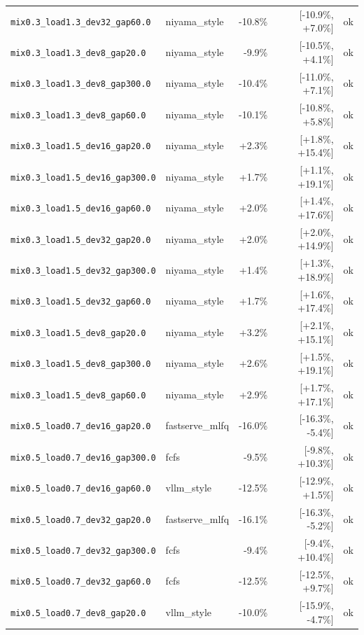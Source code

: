\begin{longtable}{llrrl}
\texttt{mix0.3\_load1.3\_dev32\_gap60.0} & niyama\_style & -10.8\% & [-10.9\%, +7.0\%] & ok \\
\texttt{mix0.3\_load1.3\_dev8\_gap20.0} & niyama\_style & -9.9\% & [-10.5\%, +4.1\%] & ok \\
\texttt{mix0.3\_load1.3\_dev8\_gap300.0} & niyama\_style & -10.4\% & [-11.0\%, +7.1\%] & ok \\
\texttt{mix0.3\_load1.3\_dev8\_gap60.0} & niyama\_style & -10.1\% & [-10.8\%, +5.8\%] & ok \\
\texttt{mix0.3\_load1.5\_dev16\_gap20.0} & niyama\_style & +2.3\% & [+1.8\%, +15.4\%] & ok \\
\texttt{mix0.3\_load1.5\_dev16\_gap300.0} & niyama\_style & +1.7\% & [+1.1\%, +19.1\%] & ok \\
\texttt{mix0.3\_load1.5\_dev16\_gap60.0} & niyama\_style & +2.0\% & [+1.4\%, +17.6\%] & ok \\
\texttt{mix0.3\_load1.5\_dev32\_gap20.0} & niyama\_style & +2.0\% & [+2.0\%, +14.9\%] & ok \\
\texttt{mix0.3\_load1.5\_dev32\_gap300.0} & niyama\_style & +1.4\% & [+1.3\%, +18.9\%] & ok \\
\texttt{mix0.3\_load1.5\_dev32\_gap60.0} & niyama\_style & +1.7\% & [+1.6\%, +17.4\%] & ok \\
\texttt{mix0.3\_load1.5\_dev8\_gap20.0} & niyama\_style & +3.2\% & [+2.1\%, +15.1\%] & ok \\
\texttt{mix0.3\_load1.5\_dev8\_gap300.0} & niyama\_style & +2.6\% & [+1.5\%, +19.1\%] & ok \\
\texttt{mix0.3\_load1.5\_dev8\_gap60.0} & niyama\_style & +2.9\% & [+1.7\%, +17.1\%] & ok \\
\texttt{mix0.5\_load0.7\_dev16\_gap20.0} & fastserve\_mlfq & -16.0\% & [-16.3\%, -5.4\%] & ok \\
\texttt{mix0.5\_load0.7\_dev16\_gap300.0} & fcfs & -9.5\% & [-9.8\%, +10.3\%] & ok \\
\texttt{mix0.5\_load0.7\_dev16\_gap60.0} & vllm\_style & -12.5\% & [-12.9\%, +1.5\%] & ok \\
\texttt{mix0.5\_load0.7\_dev32\_gap20.0} & fastserve\_mlfq & -16.1\% & [-16.3\%, -5.2\%] & ok \\
\texttt{mix0.5\_load0.7\_dev32\_gap300.0} & fcfs & -9.4\% & [-9.4\%, +10.4\%] & ok \\
\texttt{mix0.5\_load0.7\_dev32\_gap60.0} & fcfs & -12.5\% & [-12.5\%, +9.7\%] & ok \\
\texttt{mix0.5\_load0.7\_dev8\_gap20.0} & vllm\_style & -10.0\% & [-15.9\%, -4.7\%] & ok \\

\end{longtable}
